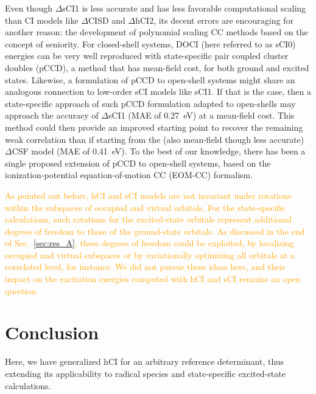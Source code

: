 \documentclass[aip,jcp,reprint,noshowkeys,superscriptaddress]{revtex4-1}
\newcommand{\fk}[1]{\textcolor{orange}{#1}}
\begin{document}
Even though $\Delta$sCI1 is less accurate and has less favorable computational scaling than CI models like $\Delta$CISD and $\Delta$hCI2,
its decent errors are encouraging for another reason:
the development of polynomial scaling CC methods based on the concept of seniority.
For closed-shell systems, DOCI (here referred to as sCI0) energies can be very well reproduced with state-specific pair coupled cluster doubles (pCCD), a method that has mean-field cost,
for both ground \cite{Bytautas_2011,Allen_1962,Smith_1965,Veillard_1967} and excited \cite{Kossoski_2021,Marie_2021} states.
Likewise, a formulation of pCCD to open-shell systems might share an analogous connection to low-order sCI models like sCI1.
If that is the case, then a state-specific approach of such pCCD formulation adapted to open-shells may approach the accuracy of $\Delta$sCI1 (MAE of \SI{0.27}{\eV}) at a mean-field cost.
This method could then provide an improved starting point to recover the remaining weak correlation than if starting from the (also mean-field though less accurate) $\Delta$CSF model (MAE of \SI{0.41}{\eV}).
To the best of our knowledge, there has been a single proposed extension of pCCD to open-shell systems, \cite{Boguslawski_2021}
based on the ionization-potential equation-of-motion CC (EOM-CC) formalism. \cite{Stanton_1994,Muneaki_2006,Bomble_2005}

\fk{As pointed out before, hCI and sCI models are not invariant under rotations within the subspaces of occupied and virtual orbitals.
For the state-specific calculations, such rotations for the excited-state orbitals represent additional degrees of freedom to those of the ground-state orbitals. \cite{Kossoski_2022}
As discussed in the end of Sec.~\ref{sec:res_A}, these degrees of freedom could be exploited,
by localizing occupied and virtual subspaces or by variationally optimizing all orbitals at a correlated level, for instance.
We did not pursue these ideas here, and their impact on the excitation energies computed with hCI and sCI remains an open question.}


\section{Conclusion}
\label{sec:conclusion}

Here, we have generalized hCI \cite{Kossoski_2022} for an arbitrary reference determinant, thus extending its applicability to radical species and state-specific excited-state calculations.
\end{document}
